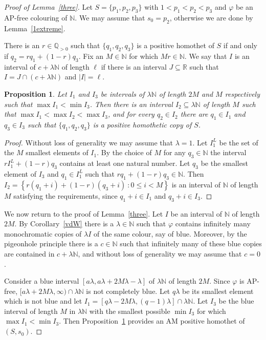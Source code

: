 \documentclass[12pt]{article}
\newcommand{\setbuilder}[2]{\left\{#1\ \colon #2\right\}}
\newcommand{\N}{{\mathbb N}}
\theoremstyle{plain}
\newtheorem{prop}[theorem]{Proposition}
\theoremstyle{definition}
\begin{document}
\begin{proof}[Proof of Lemma~\ref{three}]
Let $S=\{p_1,p_2,p_3\}$ with $1< p_1<p_2 < p_3$ and $\varphi$ be an AP-free colouring of $\mathbb{N}$.
We may assume that $s_0=p_2$, otherwise we are done by Lemma~\ref{1extreme}. 

There is an $r\in \mathbb{Q}_{>0}$ such that $\{q_1,q_2,q_3\}$ is a positive homothet of $S$ if and only if $q_2=r q_1+(1-r)q_3$. Fix an $M\in \mathbb{N}$ for which $Mr\in \N$.
We say that $I$ is an interval of $c+\lambda \mathbb{N}$ of length $\ell$ if there is an interval $J\subseteq \mathbb{R}$ such that $I=J\cap (c+\lambda \mathbb{N})$ and $|I|=\ell$.
      
    
\begin{prop}\label{propinterval} Let $I_1$ and $I_3$ be intervals of $\lambda \mathbb{N}$ of length $2M$ and $M$ respectively such that $\max I_1 <\min I_3$. Then there is an interval $I_2\subseteq \lambda\mathbb{N}$ of length $M$ such that $\max I_1 <\max I_2<\max I_3$, and for every $q_2\in I_2$ there are $q_1\in I_1$ and $q_3\in I_3$ such that $\{q_1,q_2,q_3\}$ is a positive homothetic copy of $S$. 
    \end{prop}
    
\begin{proof} Without loss of generality we may assume that $\lambda=1$. Let $I_1^L$ be the set of the $M$ smallest elements of $I_1$.
By the choice of $M$ for any $q_3\in \mathbb N$ the interval $r I_1^L+(1-r)q_3$ contains at least one natural number.
Let $q_3$ be the smallest element of $I_3$ and $q_1\in I_1^L$ such that $r q_1+(1-r)q_3\in \N$.
Then $I_2=\setbuilder{r (q_1+i)+(1-r)(q_3+i)}{0\leq i<M}$ is an interval of $\mathbb{N}$ of length $M$ satisfying the requirements, since $q_1+i\in I_1$ and $q_3+i\in I_3$.
\end{proof}
    
We now return to the proof of Lemma~\ref{three}.
Let $I$ be an interval of $\N$ of length $2M$. By Corollary~\ref{vdW} there is a $\lambda\in \N$ such that $\varphi$ contains infinitely many monochromatic copies of $\lambda I$ of the same colour, say of blue. Moreover, by the pigeonhole principle there is a $c\in \mathbb{N}$ such that infinitely many of these blue copies are contained in $c+\lambda\mathbb{N}$, and without loss of generality we may assume that $c=0$. 
    
Consider a blue interval $[a\lambda,a\lambda+2M\lambda-\lambda]$ of $\lambda \mathbb{N}$ of length $2M$.
Since $\varphi$ is AP-free, $[a\lambda+2M\lambda,\infty)\cap\lambda \mathbb{N}$ is not completely blue.
Let $q\lambda$ be its smallest element  which is not blue and let $I_1=[q\lambda-2M\lambda,(q-1)\lambda]\cap\lambda \mathbb{N}$. Let $I_3$ be the blue interval of length $M$ in $\lambda \mathbb{N}$ with the smallest possible $ \min I_3$ for which $\max I_1 <\min I_3$. Then Proposition~\ref{propinterval} provides an AM positive homothet of $(S,s_0)$. 
    

\end{proof}
\end{document}
